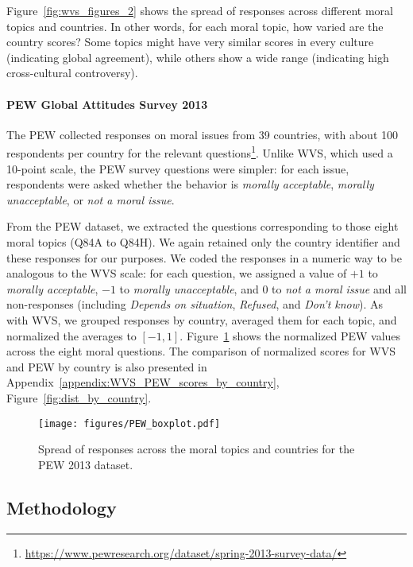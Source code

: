 \documentclass[11pt]{article}
\begin{document}
Figure~\ref{fig:wvs_figures_2} shows the spread of responses across different moral topics and countries. In other words, for each moral topic, how varied are the country scores? Some topics might have very similar scores in every culture (indicating global agreement), while others show a wide range (indicating high cross-cultural controversy). 


\paragraph{PEW Global Attitudes Survey 2013} The PEW collected responses on moral issues from 39 countries, with about 100 respondents per country for the relevant questions\footnote{\url{https://www.pewresearch.org/dataset/spring-2013-survey-data/}}. Unlike WVS, which used a 10-point scale, the PEW survey questions were simpler: for each issue, respondents were asked whether the behavior is \emph{morally acceptable}, \emph{morally unacceptable}, or \emph{not a moral issue}.

From the PEW dataset, we extracted the questions corresponding to those eight moral topics (Q84A to Q84H). We again retained only the country identifier and these responses for our purposes. We coded the responses in a numeric way to be analogous to the WVS scale: for each question, we assigned a value of \(+1\) to \emph{morally acceptable}, \(-1\) to \emph{morally unacceptable}, and \(0\) to \emph{not a moral issue} and all non-responses (including \emph{Depends on situation}, \emph{Refused}, and \emph{Don’t know}). As with WVS, we grouped responses by country, averaged them for each topic, and normalized the averages to \([-1, 1]\). Figure~\ref{fig:pew_figures_2} shows the normalized PEW values across the eight moral questions. The comparison of normalized scores for WVS and PEW by country is also presented in Appendix~\ref{appendix:WVS_PEW_scores_by_country}, Figure~\ref{fig:dist_by_country}.


\begin{figure}[H]
        \centering
        \texttt{[image: figures/PEW\_boxplot.pdf]}
        \vspace{-8pt}
        \caption{Spread of responses across the moral topics and countries for the PEW 2013 dataset.}
        \label{fig:pew_figures_2}
    \end{figure}
\vspace{-12pt}


\subsection{Methodology}
\end{document}
